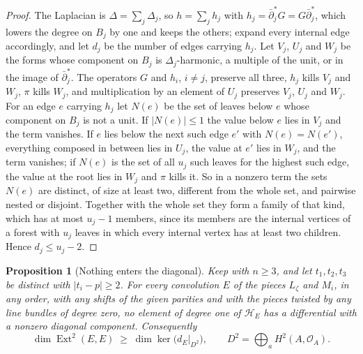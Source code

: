 \documentclass[11pt,reqno]{amsart}
\theoremstyle{plain}
\newtheorem{proposition}[theorem]{Proposition}
\theoremstyle{definition}
\theoremstyle{remark}
\newcommand{\cO}{\mathcal{O}}
\newcommand{\cH}{\mathcal{H}}
\DeclareMathOperator{\Ext}{Ext}
\begin{document}
\begin{proof}
The Laplacian is $\Delta=\sum_{j}\Delta_{j}$, so $h=\sum_{j}h_{j}$ with
$h_{j}=\bar\partial_{j}^{*}G=G\bar\partial_{j}^{*}$, which lowers the degree
on $B_{j}$ by one and keeps the others; expand every internal edge
accordingly, and let $d_{j}$ be the number of edges carrying $h_{j}$. Let
$V_{j}$, $U_{j}$ and $W_{j}$ be the forms whose component on $B_{j}$ is
$\Delta_{j}$-harmonic, a multiple of the unit, or in the image of
$\bar\partial_{j}^{*}$. The operators $G$ and $h_{i}$, $i\ne j$, preserve all
three, $h_{j}$ kills $V_{j}$ and $W_{j}$, $\pi$ kills $W_{j}$, and
multiplication by an element of $U_{j}$ preserves $V_{j}$, $U_{j}$ and
$W_{j}$. For an edge $e$ carrying $h_{j}$ let $N(e)$ be the set of leaves
below $e$ whose component on $B_{j}$ is not a unit. If $|N(e)|\le1$ the
value below $e$ lies in $V_{j}$ and the term vanishes. If $e$ lies below the
next such edge $e'$ with $N(e)=N(e')$, everything composed in between lies
in $U_{j}$, the value at $e'$ lies in $W_{j}$, and the term vanishes; if
$N(e)$ is the set of all $u_{j}$ such leaves for the highest such edge, the
value at the root lies in $W_{j}$ and $\pi$ kills it. So in a nonzero term
the sets $N(e)$ are distinct, of size at least two, different from the whole
set, and pairwise nested or disjoint. Together with the whole set they form
a family of that kind, which has at most $u_{j}-1$ members, since its members
are the internal vertices of a forest with $u_{j}$ leaves in which every
internal vertex has at least two children. Hence $d_{j}\le u_{j}-2$.
\end{proof}

\begin{proposition}[Nothing enters the diagonal]\label{prop:nothingenters}
Keep  with $n\ge3$, and let $t_{1},t_{2},t_{3}$ be
distinct with $|t_{i}-p|\ge2$. For every convolution $E$ of the pieces
$L_{\zeta}$ and $M_{i}$, in any order, with any shifts of the given parities
and with the pieces twisted by any line bundles of degree zero, no element of
degree one of $\cH_{E}$ has a differential with a nonzero diagonal
component. Consequently
\[
  \dim\Ext^{2}(E,E)\;\ge\;\dim\ker\bigl(d_{E}|_{D^{2}}\bigr),
  \qquad
  D^{2}=\bigoplus_{a}H^{2}(A,\cO_{A}).
\]
\end{proposition}
\end{document}
